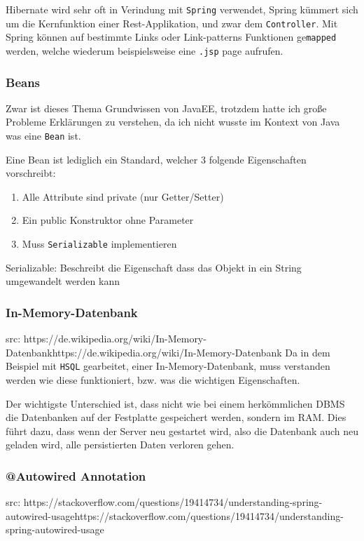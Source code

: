 Hibernate wird sehr oft in Verindung mit \verb|Spring| verwendet, Spring kümmert sich um die Kernfunktion einer Rest-Applikation, und zwar dem \verb|Controller|. Mit Spring können auf bestimmte Links oder Link-patterns Funktionen ge\verb|mapped| werden, welche wiederum beispielsweise eine \verb|.jsp| page aufrufen. 

\subsubsection{Beans}
Zwar ist dieses Thema Grundwissen von JavaEE, trotzdem hatte ich große Probleme Erklärungen zu verstehen, da ich nicht wusste im Kontext von Java was eine \verb|Bean| ist. 

Eine Bean ist lediglich ein Standard, welcher 3 folgende Eigenschaften vorschreibt:

\begin{enumerate}
	\item Alle Attribute sind private (nur Getter/Setter)
	\item Ein public Konstruktor ohne Parameter
	\item Muss \verb|Serializable| implementieren
\end{enumerate}
	
Serializable: Beschreibt die Eigenschaft dass das Objekt in ein String umgewandelt werden kann

\subsubsection{In-Memory-Datenbank}

src: {https://de.wikipedia.org/wiki/In-Memory-Datenbank}{https://de.wikipedia.org/wiki/In-Memory-Datenbank}
Da in dem Beispiel mit \verb|HSQL| gearbeitet, einer In-Memory-Datenbank, muss verstanden werden wie diese funktioniert, bzw. was die wichtigen Eigenschaften.

Der wichtigste Unterschied ist, dass nicht wie bei einem herkömmlichen DBMS die Datenbanken auf der Festplatte gespeichert werden, sondern im RAM. Dies führt dazu, dass wenn der Server neu gestartet wird, also die Datenbank auch neu geladen wird, alle persistierten Daten verloren gehen.


\subsubsection{@Autowired Annotation}
src: {https://stackoverflow.com/questions/19414734/understanding-spring-autowired-usage}{https://stackoverflow.com/questions/19414734/understanding-spring-autowired-usage}


